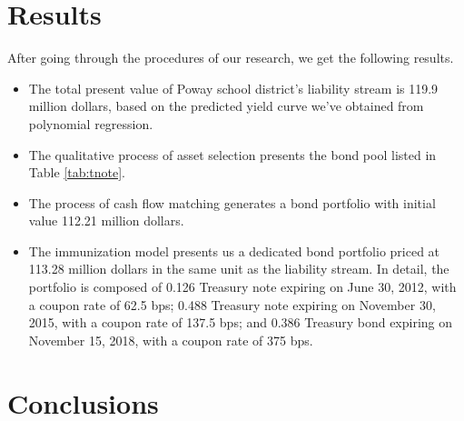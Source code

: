 \documentclass[oneside,12pt]{report}
\begin{document}
{\chapter{Results}
After going through the procedures of our research, we get the following results.
\begin{itemize}
\item The total present value of Poway school district's liability stream is 119.9 million dollars, based on the predicted yield curve we've obtained from polynomial regression.
\item The qualitative process of asset selection presents the bond pool listed in Table \ref{tab:tnote}.
\item The process of cash flow matching generates a bond portfolio with initial value 112.21 million dollars.
\item The immunization model presents us a dedicated bond portfolio priced at 113.28 million dollars in the same unit as the liability stream. In detail, the portfolio is composed of 0.126 Treasury note expiring on June 30, 2012, with a coupon rate of 62.5 bps; 0.488 Treasury note expiring on November 30, 2015, with a coupon rate of 137.5 bps; and 0.386 Treasury bond expiring on November 15, 2018, with a coupon rate of 375 bps.
\end{itemize}


\chapter{Conclusions}\label{}
		        
}
\end{document}
